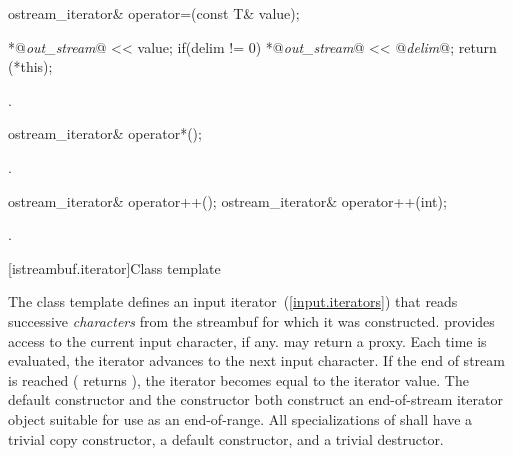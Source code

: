%
%
\begin{itemdecl}
ostream_iterator& operator=(const T& value);
\end{itemdecl}

\begin{itemdescr}
\pnum
\effects
\begin{codeblock}
*@\textit{out_stream}@ << value;
if(delim != 0)
  *@\textit{out_stream}@ << @\textit{delim}@;
return (*this);
\end{codeblock}

\begin{addedblock}
\pnum
\requires {}.
\end{addedblock}
\end{itemdescr}

%
%
\begin{itemdecl}
ostream_iterator& operator*();
\end{itemdecl}

\begin{itemdescr}
\pnum
\returns
{}.
\end{itemdescr}

%
%
\begin{itemdecl}
ostream_iterator& operator++();
ostream_iterator& operator++(int);
\end{itemdecl}

\begin{itemdescr}
\pnum
\returns
{}.
\end{itemdescr}

[istreambuf.iterator]{Class template }

\pnum
The
class template
defines an input iterator~(\ref{input.iterators}) that
reads successive
\textit{characters}
from the streambuf for which it was constructed.
provides access to the current input character, if any.
\enternote {} may return a proxy. \exitnote
Each time
is evaluated, the iterator advances to the next input character.
If the end of stream is reached ( returns
),
the iterator becomes equal to the
iterator value.
The default constructor
and the constructor
both construct an end-of-stream iterator object suitable for use
as an end-of-range.
All specializations of  shall have a trivial copy
constructor, a  default constructor, and a trivial destructor.

